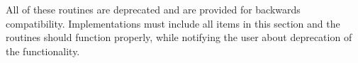 All of these routines are deprecated and are provided for backwards
compatibility. 
Implementations must include all items in this section
and the routines should function properly, while notifying the user
about deprecation of the functionality.

